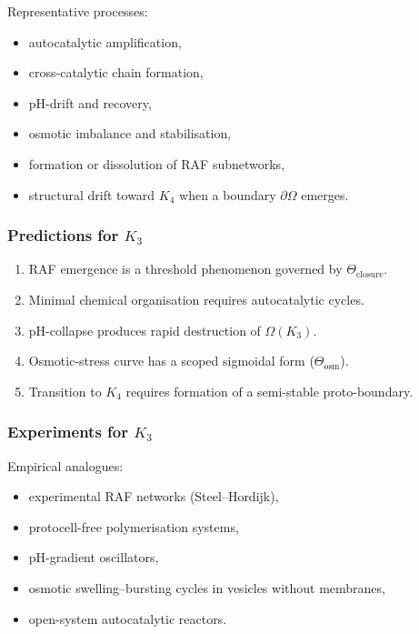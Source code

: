 Representative processes:
\begin{itemize}
    \item autocatalytic amplification,
    \item cross-catalytic chain formation,
    \item pH-drift and recovery,
    \item osmotic imbalance and stabilisation,
    \item formation or dissolution of RAF subnetworks,
    \item structural drift toward $K_4$ when a boundary $\partial\Omega$
          emerges.
\end{itemize}

\subsubsection{Predictions for \texorpdfstring{$K_3$}{K_3}}

\begin{enumerate}
    \item RAF emergence is a threshold phenomenon governed by
          $\Theta_{\mathrm{closure}}$.
    \item Minimal chemical organisation requires autocatalytic cycles.
    \item pH-collapse produces rapid destruction of $\Omega(K_3)$.
    \item Osmotic-stress curve has a scoped sigmoidal form
          ($\Theta_{\mathrm{osm}}$).
    \item Transition to $K_4$ requires formation of a semi-stable
          proto-boundary.
\end{enumerate}

\subsubsection{Experiments for \texorpdfstring{$K_3$}{K_3}}

Empirical analogues:
\begin{itemize}
    \item experimental RAF networks (Steel–Hordijk),
    \item protocell-free polymerisation systems,
    \item pH-gradient oscillators,
    \item osmotic swelling–bursting cycles in vesicles without membranes,
    \item open-system autocatalytic reactors.
\end{itemize}

